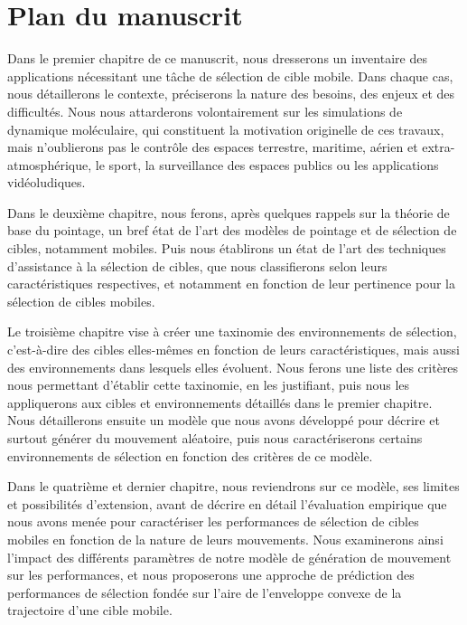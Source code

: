 \section*{Plan du manuscrit}
	Dans le premier chapitre de ce manuscrit, nous dresserons un inventaire des applications nécessitant une tâche de sélection de cible mobile. Dans chaque cas, nous détaillerons le contexte, préciserons la nature des besoins, des enjeux et des difficultés. Nous nous attarderons volontairement sur les simulations de dynamique moléculaire, qui constituent la motivation originelle de ces travaux, mais n'oublierons pas le contrôle des espaces terrestre, maritime, aérien et extra-atmosphérique, le sport, la surveillance des espaces publics ou les applications vidéoludiques.
	
	Dans le deuxième chapitre, nous ferons, après quelques rappels sur la théorie de base du pointage, un bref état de l'art des modèles de pointage et de sélection de cibles, notamment mobiles. Puis nous établirons un état de l'art des techniques d'assistance à la sélection de cibles, que nous classifierons selon leurs caractéristiques respectives, et notamment en fonction de leur pertinence pour la sélection de cibles mobiles.
	
	Le troisième chapitre vise à créer une taxinomie des environnements de sélection, c'est-à-dire des cibles elles-mêmes en fonction de leurs caractéristiques, mais aussi des environnements dans lesquels elles évoluent. Nous ferons une liste des critères nous permettant d'établir cette taxinomie, en les justifiant, puis nous les appliquerons aux cibles et environnements détaillés dans le premier chapitre. Nous détaillerons ensuite un modèle que nous avons développé pour décrire et surtout générer du mouvement aléatoire, puis nous caractériserons certains environnements de sélection en fonction des critères de ce modèle.
	
	Dans le quatrième et dernier chapitre, nous reviendrons sur ce modèle, ses limites et possibilités d'extension, avant de décrire en détail l'évaluation empirique que nous avons menée pour caractériser les performances de sélection de cibles mobiles en fonction de la nature de leurs mouvements. Nous examinerons ainsi l'impact des différents paramètres de notre modèle de génération de mouvement sur les performances, et nous proposerons une approche de prédiction des performances de sélection fondée sur l'aire de l'enveloppe convexe de la trajectoire d'une cible mobile.